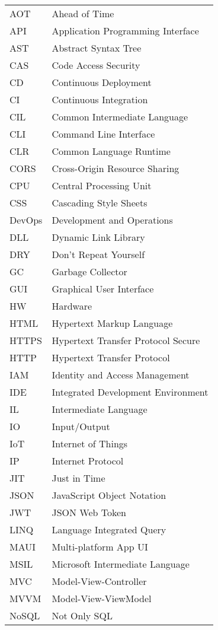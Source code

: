 
\seznamzkr

\begin{tabular}{ll}
AOT & Ahead of Time \\
API & Application Programming Interface \\
AST & Abstract Syntax Tree \\
CAS & Code Access Security \\
CD & Continuous Deployment \\
CI & Continuous Integration \\
CIL & Common Intermediate Language \\
CLI & Command Line Interface \\
CLR & Common Language Runtime \\
CORS & Cross-Origin Resource Sharing \\
CPU & Central Processing Unit \\
CSS & Cascading Style Sheets \\
DevOps & Development and Operations \\
DLL & Dynamic Link Library \\
DRY & Don't Repeat Yourself \\
GC & Garbage Collector \\
GUI & Graphical User Interface \\
HW & Hardware \\
HTML & Hypertext Markup Language \\
HTTPS & Hypertext Transfer Protocol Secure \\
HTTP & Hypertext Transfer Protocol \\
IAM & Identity and Access Management \\
IDE & Integrated Development Environment \\
IL & Intermediate Language \\
IO & Input/Output \\
IoT & Internet of Things \\
IP & Internet Protocol \\
JIT & Just in Time \\
JSON & JavaScript Object Notation \\
JWT & JSON Web Token \\
LINQ & Language Integrated Query \\
MAUI & Multi-platform App UI \\
MSIL & Microsoft Intermediate Language \\
MVC & Model-View-Controller \\
MVVM & Model-View-ViewModel \\
NoSQL & Not Only SQL \\
\end{tabular}

